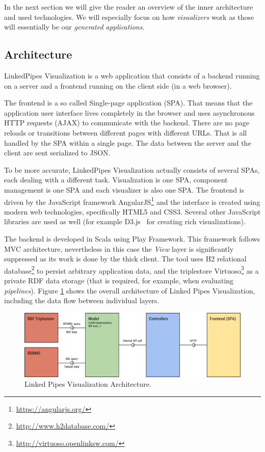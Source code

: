 In the next section we will give the reader an overview of the inner architecture and used technologies. We will especially focus on how \emph{visualizers} work as those will essentially be our \emph{generated applications}.

\subsection{Architecture}
\label{sec:linkedpipes:architecture}

LinkedPipes Visualization is a web application that consists of a backend running on a server and a frontend running on the client side (in a web browser). 

The frontend is a so called Single-page application (SPA). That means that the application user interface lives completely in the browser and uses asynchronous HTTP requests (AJAX) to communicate with the backend. There are no page reloads or transitions between different pages with different URLs. That is all handled by the SPA within a single page. The data between the server and the client are sent serialized to JSON.

To be more accurate, LinkedPipes Visualization actually consists of several SPAs, each dealing with a different task. Visualization is one SPA, component management is one SPA and each visualizer is also one SPA. The frontend is driven by the JavaScript framework AngularJS\footnote{\url{https://angularjs.org/}} and the interface is created using modern web technologies, specifically HTML5 and CSS3. Several other JavaScript libraries are used as well (for example D3.js~\cite{d3js} for creating rich visualizations).

The backend is developed in Scala using Play Framework. This framework follows MVC architecture, nevertheless in this case the \emph{View} layer is significantly suppressed as its work is done by the thick client. The tool uses H2 relational database\footnote{\url{http://www.h2database.com/}} to persist arbitrary application data, and the triplestore Virtuoso\footnote{\url{http://virtuoso.openlinksw.com/}} as a private RDF data storage (that is required, for example, when evaluating \emph{pipelines}). Figure \ref{fig:linked-pipes-visualization-architecture} shows the overall architecture of Linked Pipes Visualization, including the data flow between individual layers.

\begin{figure}
	\centering
	\includegraphics[width=140mm]{img/03_linked_pipes_visualization_architecture.png}
	\caption{Linked Pipes Visualization Architecture.}
    \label{fig:linked-pipes-visualization-architecture}
\end{figure}

